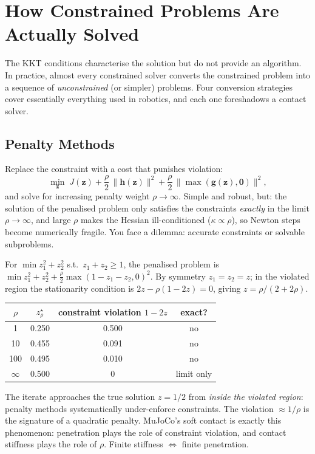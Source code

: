 \documentclass[11pt,twoside]{report}
\theoremstyle{definition}
\theoremstyle{plain}
\theoremstyle{remark}
\newcommand{\0}{\bm{0}}
\begin{document}
\section{How Constrained Problems Are Actually Solved}
\label{sec:solving-constrained}

The KKT conditions characterise the solution but do not provide an
algorithm. In practice, almost every constrained solver converts the
constrained problem into a sequence of \emph{unconstrained} (or simpler)
problems. Four conversion strategies cover essentially everything used
in robotics, and each one foreshadows a contact solver.

\subsection{Penalty Methods}
Replace the constraint with a cost that punishes violation:
\begin{equation}\label{eq:penalty}
\min_{\bm{z}}\;J(\bm{z})+\frac{\rho}{2}\,\|\bm{h}(\bm{z})\|^{2}
+\frac{\rho}{2}\,\|\max(\bm{g}(\bm{z}),\0)\|^{2},
\end{equation}
and solve for increasing penalty weight $\rho\to\infty$.
Simple and robust, but: the solution of the penalised problem only
satisfies the constraints \emph{exactly} in the limit $\rho\to\infty$,
and large $\rho$ makes the Hessian ill-conditioned
($\kappa\propto\rho$), so Newton steps become numerically fragile.
You face a dilemma: accurate constraints or solvable subproblems.

\begin{examplebox}
For $\min z_{1}^{2}+z_{2}^{2}$ s.t.\ $z_{1}+z_{2}\ge 1$, the penalised
problem is $\min z_{1}^{2}+z_{2}^{2}+\tfrac{\rho}{2}\max(1-z_{1}-z_{2},0)^{2}$.
By symmetry $z_{1}=z_{2}=z$; in the violated region the stationarity
condition is $2z-\rho(1-2z)=0$, giving $z=\rho/(2+2\rho)$.
\begin{center}
\begin{tabular}{cccc}
\toprule
$\rho$ & $z^{\star}_{\rho}$ & constraint violation $1-2z$ & exact?\\
\midrule
1 & 0.250 & 0.500 & no\\
10 & 0.455 & 0.091 & no\\
100 & 0.495 & 0.010 & no\\
$\infty$ & 0.500 & 0 & limit only\\
\bottomrule
\end{tabular}
\end{center}
The iterate approaches the true solution $z=1/2$ from \emph{inside the
violated region}: penalty methods systematically under-enforce
constraints. The violation $\approx 1/\rho$ is the signature of a
quadratic penalty. MuJoCo's soft contact is exactly this phenomenon:
penetration plays the role of constraint violation, and contact
stiffness plays the role of $\rho$. Finite stiffness $\Leftrightarrow$
finite penetration.
\end{examplebox}
\end{document}
